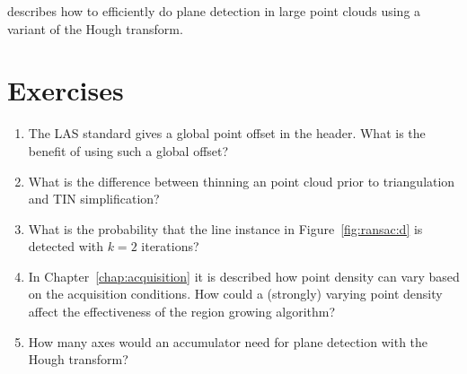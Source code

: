 \citet{Limberger15} describes how to efficiently do plane detection in large point clouds using a variant of the Hough transform.

%
\section{Exercises}


\begin{enumerate}
   \item The LAS standard gives a global point offset in the header. What is the benefit of using such a global offset?  
   \item What is the difference between thinning an point cloud prior to triangulation and TIN simplification?
  \item What is the probability that the line instance in Figure~\ref{fig:ransac:d} is detected with $k=2$ iterations?
  \item In Chapter~\ref{chap:acquisition} it is described how point density can vary based on the acquisition conditions. How could a (strongly) varying point density affect the effectiveness of the region growing algorithm?
  \item How many axes would an accumulator need for plane detection with the Hough transform?

\end{enumerate}
